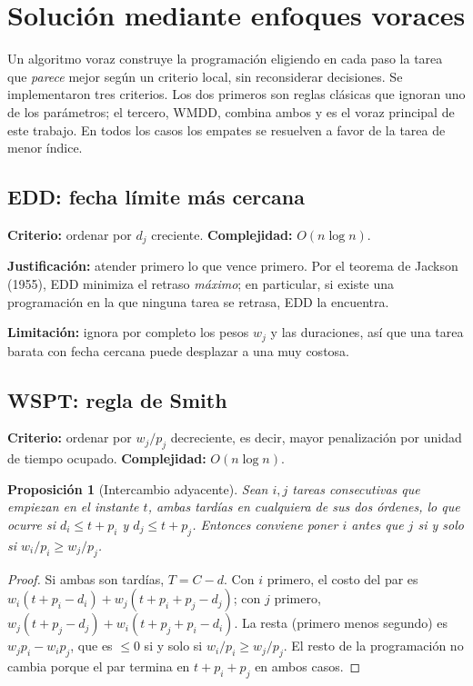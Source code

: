 \documentclass[10pt,twocolumn,letterpaper]{article}
\newtheorem{proposicion}{Proposición}
\begin{document}
\section{Solución mediante enfoques voraces}

Un algoritmo voraz construye la programación eligiendo en cada paso la tarea
que \emph{parece} mejor según un criterio local, sin reconsiderar decisiones.
Se implementaron tres criterios. Los dos primeros son reglas clásicas que
ignoran uno de los parámetros; el tercero, WMDD, combina ambos y es el voraz
principal de este trabajo. En todos los casos los empates se resuelven a favor
de la tarea de menor índice.

\subsection{EDD: fecha límite más cercana}

\textbf{Criterio:} ordenar por $d_j$ creciente. \textbf{Complejidad:}
$O(n\log n)$.

\textbf{Justificación:} atender primero lo que vence primero. Por el teorema de
Jackson (1955), EDD minimiza el retraso \emph{máximo}; en particular, si
existe una programación en la que ninguna tarea se retrasa, EDD la encuentra.

\textbf{Limitación:} ignora por completo los pesos $w_j$ y las duraciones, así
que una tarea barata con fecha cercana puede desplazar a una muy costosa.

\subsection{WSPT: regla de Smith}\label{sec:wspt}

\textbf{Criterio:} ordenar por $w_j/p_j$ decreciente, es decir, mayor
penalización por unidad de tiempo ocupado. \textbf{Complejidad:}
$O(n\log n)$.

\begin{proposicion}[Intercambio adyacente]\label{prop:intercambio}
Sean $i,j$ tareas consecutivas que empiezan en el instante $t$, ambas tardías
en cualquiera de sus dos órdenes, lo que ocurre si $d_i\le t+p_i$ y
$d_j\le t+p_j$. Entonces conviene poner $i$ antes que $j$ si y solo si
$w_i/p_i\ge w_j/p_j$.
\end{proposicion}

\begin{proof}
Si ambas son tardías, $T=C-d$. Con $i$ primero, el costo del par es
$w_i(t+p_i-d_i)+w_j(t+p_i+p_j-d_j)$; con $j$ primero,
$w_j(t+p_j-d_j)+w_i(t+p_j+p_i-d_i)$. La resta (primero menos segundo) es
$w_jp_i-w_ip_j$, que es $\le0$ si y solo si $w_i/p_i\ge w_j/p_j$. El resto de
la programación no cambia porque el par termina en $t+p_i+p_j$ en ambos casos.
\end{proof}
\end{document}
